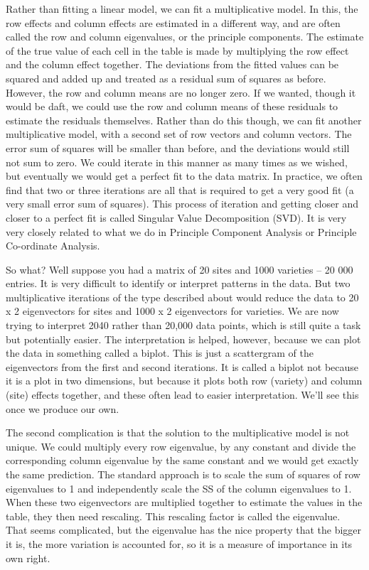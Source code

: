 \documentclass[
]{book}
\begin{document}
Rather than fitting a linear model, we can fit a multiplicative model. In this, the row effects and column effects are estimated in a different way, and are often called the row and column eigenvalues, or the principle components. The estimate of the true value of each cell in the table is made by multiplying the row effect and the column effect together. The deviations from the fitted values can be squared and added up and treated as a residual sum of squares as before. However, the row and column means are no longer zero. If we wanted, though it would be daft, we could use the row and column means of these residuals to estimate the residuals themselves. Rather than do this though, we can fit another multiplicative model, with a second set of row vectors and column vectors. The error sum of squares will be smaller than before, and the deviations would still not sum to zero. We could iterate in this manner as many times as we wished, but eventually we would get a perfect fit to the data matrix. In practice, we often find that two or three iterations are all that is required to get a very good fit (a very small error sum of squares). This process of iteration and getting closer and closer to a perfect fit is called Singular Value Decomposition (SVD). It is very very closely related to what we do in Principle Component Analysis or Principle Co-ordinate Analysis.

So what? Well suppose you had a matrix of 20 sites and 1000 varieties -- 20 000 entries. It is very difficult to identify or interpret patterns in the data. But two multiplicative iterations of the type described about would reduce the data to 20 x 2 eigenvectors for sites and 1000 x 2 eigenvectors for varieties. We are now trying to interpret 2040 rather than 20,000 data points, which is still quite a task but potentially easier. The interpretation is helped, however, because we can plot the data in something called a biplot. This is just a scattergram of the eigenvectors from the first and second iterations. It is called a biplot not because it is a plot in two dimensions, but because it plots both row (variety) and column (site) effects together, and these often lead to easier interpretation. We'll see this once we produce our own.

The second complication is that the solution to the multiplicative model is not unique. We could multiply every row eigenvalue, by any constant and divide the corresponding column eigenvalue by the same constant and we would get exactly the same prediction. The standard approach is to scale the sum of squares of row eigenvalues to 1 and independently scale the SS of the column eigenvalues to 1. When these two eigenvectors are multiplied together to estimate the values in the table, they then need rescaling. This rescaling factor is called the eigenvalue. That seems complicated, but the eigenvalue has the nice property that the bigger it is, the more variation is accounted for, so it is a measure of importance in its own right.
\end{document}
